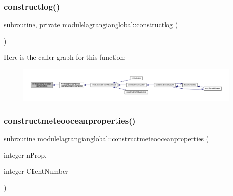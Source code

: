 \subsubsection{\texorpdfstring{constructlog()}{constructlog()}}
{\footnotesize\ttfamily subroutine, private modulelagrangianglobal\+::constructlog (\begin{DoxyParamCaption}{ }\end{DoxyParamCaption})\hspace{0.3cm}{\ttfamily [private]}}

Here is the caller graph for this function\+:\nopagebreak
\begin{figure}[H]
\begin{center}
\leavevmode
\includegraphics[width=350pt]{namespacemodulelagrangianglobal_aa700601bd9f8ad04a50534e66725efc4_icgraph}
\end{center}
\end{figure}
\mbox{\label{namespacemodulelagrangianglobal_afb3b7fc4fe38ef436cb911bb192358f1}} 
\subsubsection{\texorpdfstring{constructmeteooceanproperties()}{constructmeteooceanproperties()}}
{\footnotesize\ttfamily subroutine modulelagrangianglobal\+::constructmeteooceanproperties (\begin{DoxyParamCaption}\item[{integer}]{n\+Prop,  }\item[{integer}]{Client\+Number }\end{DoxyParamCaption})\hspace{0.3cm}{\ttfamily [private]}}

